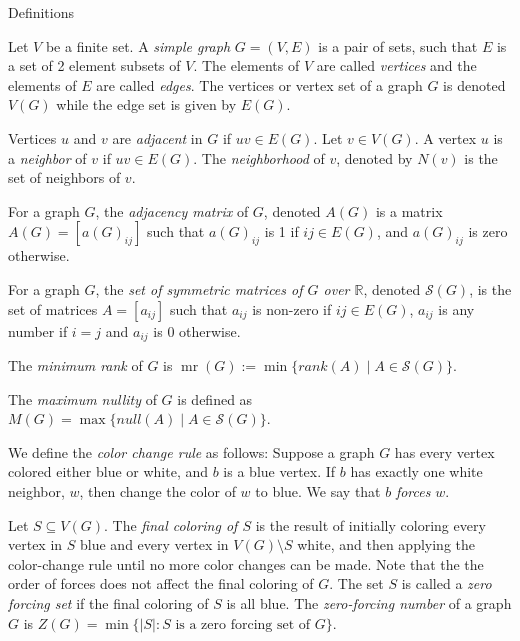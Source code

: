 \documentclass[final]{beamer}
\newcommand{\mr}{\operatorname{mr}}
\begin{document}
\begin{frame}{}
\begin{columns}[t]
\begin{column}{0.282\linewidth}
\begin{block} {Definitions}
      \item Let $V$ be a finite set. A {\color{blue}\emph{simple graph}} $G=(V,E)$ is a pair of sets, such that $E$ is a set of 2 element subsets of $V$. The elements of $V$ are called {\color{blue}\emph{vertices}} and the elements of $E$ are called {\color{blue}\emph{edges}}. The vertices or vertex set of a graph $G$ is denoted $V(G)$ while the edge set is given by $E(G)$.
      \item Vertices $u$ and $v$ are {\color{blue}\emph{adjacent}} in $G$ if $uv \in E(G)$. Let $v \in V(G)$. A vertex $u$ is a {\color{blue}\emph{neighbor}} of $v$ if $uv \in E(G)$. The {\color{blue}\emph{neighborhood}} of $v$, denoted by $N(v)$ is the set of neighbors of $v$.
      \item For a graph $G$, the {\color{blue}\emph{adjacency matrix}} of $G$, denoted $A(G)$ is a matrix $A(G) = [a(G)_{ij}]$ such that $a(G)_{ij}$ is 1 if $ij \in E(G)$, and $a(G)_{ij}$ is zero otherwise. 
      \item For a graph $G$, the {\color{blue}\emph{set of symmetric matrices of $G$ over $\mathbb{R}$}}, denoted $\mathcal{S}(G)$,  is the set of matrices $A=[a_{ij}]$ such that $a_{ij}$ is non-zero if $ij\in E(G)$, $a_{ij}$ is any number if $i=j$ and $a_{ij}$ is $0$ otherwise. 
	  \item The {\color{blue}\emph{minimum rank}} of $G$ is $\mr(G) := \min\{rank(A) \mid A \in \mathcal{S}(G)\}$.
      \item The {\color{blue}\emph{maximum nullity}} of $G$ is defined as $M(G) = \max\{null(A) \mid A \in \mathcal{S}(G)\}$.
	  \item We define the {\color{blue}\emph{color change rule}} as follows: Suppose a graph $G$ has every vertex colored either blue or white, and $b$ is a blue vertex. If $b$ has exactly one white neighbor, $w$, then change the color of $w$ to blue. We say that $b$ {\color{blue}\emph{forces }}$w$.
      \item Let $S \subseteq V(G)$. The {\emph{final coloring of $S$}} is the result of initially coloring every vertex in $S$ blue and every vertex in $V(G) \setminus S$ white, and then applying the color-change rule until no more color changes can be made. Note that the the order of forces does not affect the final coloring of $G$. The set $S$ is called a {\emph{zero forcing set}} if the final coloring of $S$ is all blue. The {\color{blue}\emph{zero-forcing number}} of a graph $G$ is $Z(G) = \min\{|S| : S\text{ is a zero forcing set of }G\}$. 


\end{block}
\end{column}
\end{columns}
\end{frame}
\end{document}
